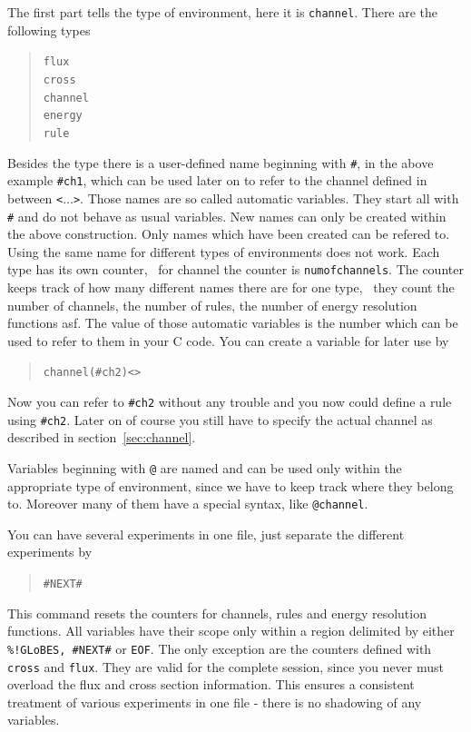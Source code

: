 The first part tells the type of environment, here it is {\tt channel}. 
There are the following types 
\begin{quote}
{\tt flux\\
cross\\
channel\\
energy\\
rule
}
\end{quote}
Besides the type there is a user-defined name beginning with {\tt \#}, in the
above example {\tt \#ch1}, which can be used later on to refer to the 
channel defined in between {\tt <$\ldots$>}. Those names are so called
automatic variables. They start all with {\tt \#} and do not behave as 
usual variables. New names can only be
created within the above construction. Only names which have been created
can be refered to. Using the same name for different types of environments 
does not work.  Each type has its own counter, \eg\ for channel the counter is 
{\tt numofchannels}. The counter keeps track of how many different names 
there are for one type, \ie\ they count the number of channels, 
the number of rules, the number of energy resolution functions asf. 
The value of those automatic variables is the number which can be used 
to refer to them in your C code. You can create a variable for later use by
\begin{quote}
{\tt    channel(\#ch2)<>}
\end{quote}
Now you can refer to {\tt \#ch2} without any trouble and you now could define
a rule using {\tt \#ch2}. Later on of course you still have to specify the
actual channel as described in section~\ref{sec:channel}.

Variables beginning with {\tt @} are named and can be used only within the 
appropriate type of environment, since we have to keep track where 
they belong to. Moreover many of them have a special syntax, like 
{\tt @channel}.          

You can have several experiments in one file, just separate the different
 experiments by 
\begin{quote}
{\tt    \#NEXT\#}
\end{quote}
This command resets the counters for channels, rules and energy resolution
functions. All variables have their scope only within a region delimited
by either {\tt \%!GLoBES, \#NEXT\#} or {\tt EOF}. The only exception are 
the counters defined with {\tt cross} and {\tt flux}. They are valid for 
the complete session, since you never must overload the flux and 
cross section information. This ensures  a consistent treatment of various 
experiments in one file - there is no  shadowing of any variables.

